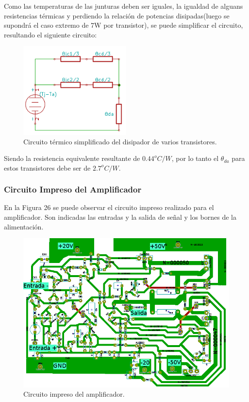 Como las temperaturas de las junturas deben ser iguales, la igualdad de alguans resistencias térmicas y perdiendo la relación de potencias disipadas(luego se supondrá el caso extremo de 7W por transistor), se puede simplificar el circuito, resultando el siguiente circuito:

\begin{figure}[H]
\centerline{
\includegraphics[width=0.5\textwidth]{img/disipador_cir2.png}}
\caption{Circuito térmico simplificado del disipador de varios transistores.}
\end{figure}

Siendo la resistencia equivalente resultante de $0.44^oC/W$, por lo tanto el $\theta_{da}$ para estos transistores debe ser de $2.7^oC/W$.
\subsubsection{Circuito Impreso del Amplificador}

En la Figura 26 se puede observar el circuito impreso realizado para el amplificador. Son indicadas las entradas y la salida de señal y los bornes de la alimentación.

\begin{figure}[H]
\centerline{
\includegraphics[width=1\textwidth]{img/PCB1.png}}
\caption{Circuito impreso del amplificador.}
\end{figure}

